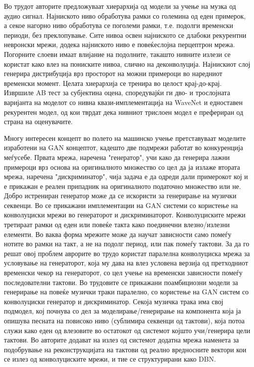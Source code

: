 Во трудот \cite{Mehri2016} авторите предложуваат хиерархија од модели за учење на музка од аудио сигнал. Најниското ниво обработува рамки со големина од еден примерок, а секое нагорно ниво обработува се поголеми рамки, т.е. подолги временски периоди, без преклопување. Сите нивоа освен најниското се длабоки рекурентни невронски мрежи, додека најниското ниво е повеќеслојна перцептрон мрежа. Погорните слоеви имаат влијание на подолните, такашто нивните излези се користат како влез на пониските нивоа, слично на деконволуција. Најнискиот слој генерира дистрибуција врз просторот на можни примероци во наредниот временски момент. Целата хиерархија се тренира во целост крај-до-крај. Извршиле AB тест за субјектина оцена, споредувајќи ги дво- и трослојната варијанта на моделот со нивна квази-имплементација на WaveNet \cite{Oord2016} и едноставен рекурентен модел, од кои тврдат дека нивниот трислоен модел е префериран од страна на оценувачите.

Многу интересен концепт во полето на машинско учење претставуваат моделите изработени на GAN концептот, кадешто две подмрежи работат во конкуренција меѓусебе. Првата мрежа, наречена "генератор", учи како да генерира лажни примероци врз основа на оригиналното множество со цел да ја излаже втората мрежа, наречена "дискриминатор", чија задача е да одреди дали примерокот кој и е прикажан е реален припадник на оригиналното податочно множество или не. Добро истрениран генератор може да се искористи за генерирање на музички секвенци. Во \cite{Yang2017,Dong2017,Dong2018} се прикажани имплементации на GAN системи со користење на конволуциски мрежи во генераторот и дискриминаторот. Конволуциските мрежи третираат рамки од еден или повеќе такта како поединечни влезно/излезни елементи. Во ваква форма мрежите може да научат зависности само помеѓу нотите во рамки на такт, а не на подолг период, или пак помеѓу тактови. За да го решат овој проблем аврорите во трудо \cite{Yang2017} користат паралелна конволуциска мрежа за условување на генераторот, која му дава на влез условена верзија од претходниот временски чекор на генераторот, со цел учење на временски зависности помеѓу последователни тактови. Во трудовите \cite{Dong2017,Dong2018} се прикажани поамбициозни модели за генерирање на повеќе музички траки паралелно, со користење на GAN систем со конволуциски генератор и дискриминатор. Секоја музичка трака има свој подмодел, кој почнува со дел за моделирање/генерирање на компонента која ја опишува песната на повисоко ниво (сублимира секвенци од тактови), која потоа служи како еден од влезовите во остатокот од системот којшто учи/генерира цели тактови. Во \cite{Dong2018} авторите додават на излез од системот додатна мрежа наменета за подобрување на реконструкцијата на тактови од реално вредносните вектори кои се излез од конволуциските мрежи, и тие се структурирани како DBN.

